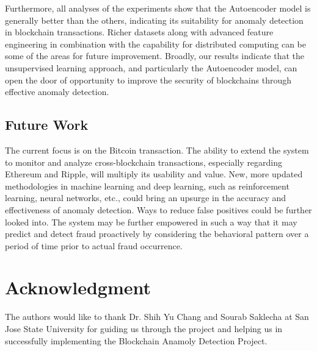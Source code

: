 \documentclass[journal]{IEEEtran}
\begin{document}
Furthermore, all analyses of the experiments show that the Autoencoder model is generally better than the others, indicating its suitability for anomaly detection in blockchain transactions. Richer datasets along with advanced feature engineering in combination with the capability for distributed computing can be some of the areas for future improvement. Broadly, our results indicate that the unsupervised learning approach, and particularly the Autoencoder model, can open the door of opportunity to improve the security of blockchains through effective anomaly detection. 

\subsection{Future Work}
The current focus is on the Bitcoin transaction. The ability to extend the system to monitor and analyze cross-blockchain transactions, especially regarding Ethereum and Ripple, will multiply its usability and value. 
New, more updated methodologies in machine learning and deep learning, such as reinforcement learning, neural networks, etc., could bring an upsurge in the accuracy and effectiveness of anomaly detection. 
Ways to reduce false positives could be further looked into. The system may be further empowered in such a way that it may predict and detect fraud proactively by considering the behavioral pattern over a period of time prior to actual fraud occurrence.



\section*{Acknowledgment}
The authors would like to thank Dr. Shih Yu Chang and Sourab Saklecha at San Jose State University for guiding us through the project and helping us in successfully implementing the Blockchain Anamoly Detection Project.
\end{document}
